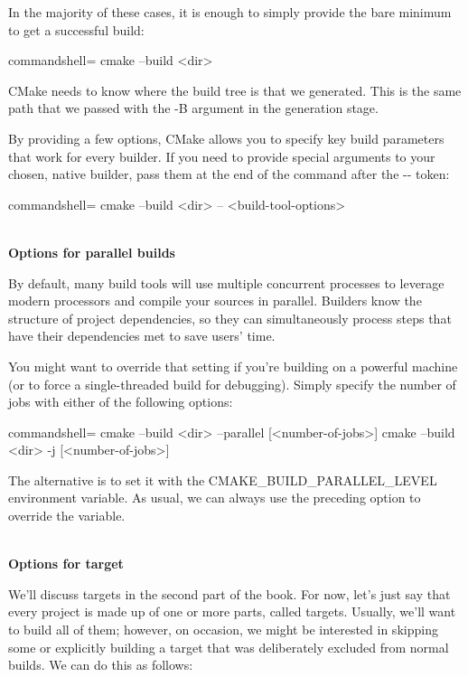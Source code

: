 In the majority of these cases, it is enough to simply provide the bare minimum to get a successful build:

\begin{tcblisting}{commandshell={}}
cmake --build <dir>
\end{tcblisting}

CMake needs to know where the build tree is that we generated. This is the same path that we passed with the -B argument in the generation stage.

By providing a few options, CMake allows you to specify key build parameters that work for every builder. If you need to provide special arguments to your chosen, native builder, pass them at the end of the command after the -{}- token:

\begin{tcblisting}{commandshell={}}
cmake --build <dir> -- <build-tool-options>
\end{tcblisting}

\hspace*{\fill} \\ %
\noindent
\textbf{Options for parallel builds}

By default, many build tools will use multiple concurrent processes to leverage modern processors and compile your sources in parallel. Builders know the structure of project  dependencies, so they can simultaneously process steps that have their dependencies met to save users' time.

You might want to override that setting if you're building on a powerful machine (or to force a single-threaded build for debugging). Simply specify the number of jobs with either of the following options:

\begin{tcblisting}{commandshell={}}
cmake --build <dir> --parallel [<number-of-jobs>]
cmake --build <dir> -j [<number-of-jobs>]
\end{tcblisting}

The alternative is to set it with the CMAKE\_BUILD\_PARALLEL\_LEVEL environment variable. As usual, we can always use the preceding option to override the variable.

\hspace*{\fill} \\ %
\noindent
\textbf{Options for target}

We'll discuss targets in the second part of the book. For now, let's just say that every project is made up of one or more parts, called targets. Usually, we'll want to build all of them; however, on occasion, we might be interested in skipping some or explicitly building a target that was deliberately excluded from normal builds. We can do this as follows:

